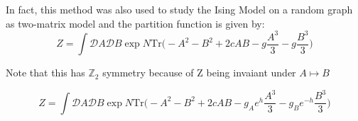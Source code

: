 \documentclass[11pt]{article}
\begin{document}
In fact, this method was also used to study the Ising Model on a random graph as two-matrix model 
\cite{Kazakov:1986hu}
and the partition function is given by:
\begin{equation}
	\label{eq:Kaz1} 
	Z = \int \mathcal{D}A \mathcal{D}B \exp N \mbox{Tr} \Bigg(-A^2 -B^2 + 2c AB -g \frac{A^3}{3} - g\frac{B^3}{3}  \Bigg)
\end{equation}

Note that this has $\mathbb{Z}_{2}$ symmetry because of 
Z being invaiant under $A \mapsto B$



\begin{equation}
	\label{eq:RIsing1} 
	Z = \int \mathcal{D}A \mathcal{D}B \exp N \mbox{Tr} \Bigg(-A^2 -B^2 + 2c AB -g_{A}e^{h} \frac{A^3}{3} 
	- g_{B}e^{-h} \frac{B^3}{3}  \Bigg)
\end{equation}
\end{document}
